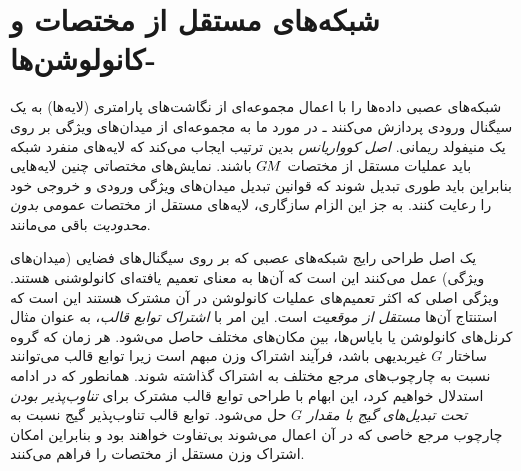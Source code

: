 

\section{شبکه‌های مستقل از مختصات و \textit{}-کانولوشن‌ها}
\label{sec:gauge_CNNs_local}


شبکه‌های عصبی داده‌ها را با اعمال مجموعه‌ای از نگاشت‌های پارامتری (لایه‌ها) به یک سیگنال ورودی پردازش می‌کنند ـ در مورد ما به مجموعه‌ای از میدان‌های ویژگی بر روی یک منیفولد ریمانی.
\emph{اصل کوواریانس} بدین ترتیب ایجاب می‌کند که لایه‌های منفرد شبکه باید عملیات مستقل از مختصات $G\mkern-1.4muM$ باشند.
نمایش‌های مختصاتی چنین لایه‌هایی بنابراین باید طوری تبدیل شوند که قوانین تبدیل میدان‌های ویژگی ورودی و خروجی خود را رعایت کنند.
به جز این الزام سازگاری، لایه‌های مستقل از مختصات عمومی \emph{بدون محدودیت} باقی می‌مانند.


یک اصل طراحی رایج شبکه‌های عصبی که بر روی سیگنال‌های فضایی (میدان‌های ویژگی) عمل می‌کنند این است که آن‌ها به معنای تعمیم یافته‌ای کانولوشنی هستند.
ویژگی اصلی که اکثر تعمیم‌های عملیات کانولوشن در آن مشترک هستند این است که استنتاج آن‌ها \emph{مستقل از موقعیت} است.
این امر با \emph{اشتراک توابع قالب}، به عنوان مثال کرنل‌های کانولوشن یا بایاس‌ها، بین مکان‌های مختلف حاصل می‌شود.
هر زمان که گروه ساختار $G$ غیربدیهی باشد، فرآیند اشتراک وزن مبهم است زیرا توابع قالب می‌توانند نسبت به چارچوب‌های مرجع مختلف به اشتراک گذاشته شوند.
همانطور که در ادامه استدلال خواهیم کرد، این ابهام با طراحی توابع قالب مشترک برای \emph{تناوب‌پذیر بودن تحت تبدیل‌های گیج با مقدار $G$} حل می‌شود.
توابع قالب تناوب‌پذیر گیج نسبت به چارچوب مرجع خاصی که در آن اعمال می‌شوند بی‌تفاوت خواهند بود و بنابراین امکان اشتراک وزن مستقل از مختصات را فراهم می‌کنند.



\etocsettocstyle{}{} %
\localtableofcontents



